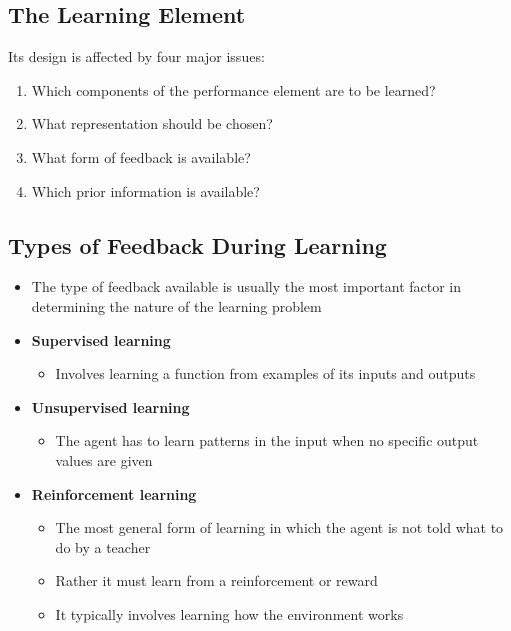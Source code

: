 \documentclass[conference, a4paper]{styles/acmsiggraph}
\begin{document}
    \subsection{The Learning Element}
        Its design is affected by four major issues:
        \begin{enumerate}
            \item Which components of the performance element are to be learned?
            \item What representation should be chosen?
            \item What form of feedback is available?
            \item Which prior information is available?
        \end{enumerate}
    
    \subsection{Types of Feedback During Learning}
        \begin{itemize}
            \item The type of feedback available is usually the most important factor in determining the nature of the learning problem
            \item \textbf{Supervised learning}
            \begin{itemize}
                \item Involves learning a function from examples of its inputs and outputs
            \end{itemize}
            \item \textbf{Unsupervised learning}
            \begin{itemize}
                \item The agent has to learn patterns in the input when no specific output values are given
            \end{itemize}
            \item \textbf{Reinforcement learning}
            \begin{itemize}
                \item The most general form of learning in which the agent is not told what to do by a teacher
                \item Rather it must learn from a reinforcement or reward
                \item It typically involves learning how the environment works
            \end{itemize}
        \end{itemize}
    
\end{document}
